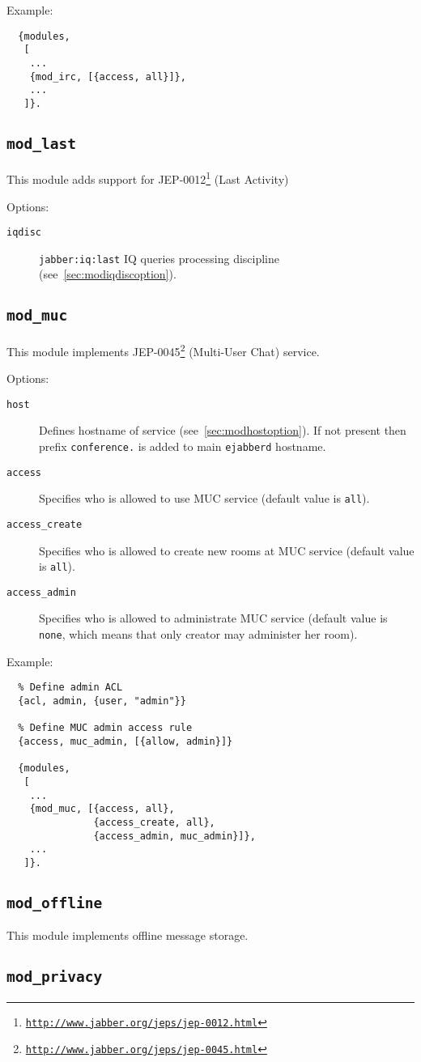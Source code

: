 \documentclass[a4paper,10pt]{article}
\newcommand{\bracehack}{\def\{{\char"7B}\def\}{\char"7D}}
\newcommand{\ns}[1]{\texttt{#1}}
\newcommand{\jid}[1]{\texttt{#1}}
\newcommand{\term}[1]{\texttt{#1}}
\newcommand{\ejabberd}{\texttt{ejabberd}}
\newcommand{\module}[1]{\texttt{#1}}
\newcommand{\modlast}{\module{mod\_last}}
\newcommand{\modmuc}{\module{mod\_muc}}
\newcommand{\modoffline}{\module{mod\_offline}}
\newcommand{\modprivacy}{\module{mod\_privacy}}
\newcommand{\titem}[1]{\item[\bracehack\texttt{#1}]}
\gdef\footahref#1#2{#2\footnote{\href{#1}{\texttt{#1}}}}
\newcommand{\tjepref}[2]{\footahref{http://www.jabber.org/jeps/jep-#1.html}{#2}}
\newcommand{\jepref}[1]{\tjepref{#1}{JEP-#1}}
\newcommand{\iqdiscitem}[1]{\titem{iqdisc} #1 IQ queries processing
discipline (see~\ref{sec:modiqdiscoption}).}
\newcommand{\hostitem}[1]{\titem{host} Defines hostname of service
(see~\ref{sec:modhostoption}). If not present
then prefix \jid{#1.} is added to main \ejabberd{} hostname.}
\begin{document}
Example:
\begin{verbatim}
  {modules,
   [
    ...
    {mod_irc, [{access, all}]},
    ...
   ]}.
\end{verbatim}


\subsection{\modlast{}}
\label{sec:modlast}

This module adds support for \jepref{0012} (Last Activity)

Options:
\begin{description}
\iqdiscitem{\ns{jabber:iq:last}}
\end{description}


\subsection{\modmuc{}}
\label{sec:modmuc}

This module implements \jepref{0045} (Multi-User Chat) service.

Options:
\begin{description}
\hostitem{conference}
\titem{access} Specifies who is allowed to use MUC service (default value is \term{all}).
\titem{access\_create} Specifies who is allowed to create new rooms at
  MUC service (default value is \term{all}).
\titem{access\_admin} Specifies who is allowed to administrate MUC service
(default value is \term{none}, which means that only creator may administer her room).
\end{description}

Example:
\begin{verbatim}
  % Define admin ACL
  {acl, admin, {user, "admin"}}

  % Define MUC admin access rule
  {access, muc_admin, [{allow, admin}]}

  {modules,
   [
    ...
    {mod_muc, [{access, all},
               {access_create, all},
               {access_admin, muc_admin}]},
    ...
   ]}.
\end{verbatim}


\subsection{\modoffline{}}
\label{sec:modoffline}

This module implements offline message storage.


\subsection{\modprivacy{}}
\label{sec:modprivacy}
\end{document}
